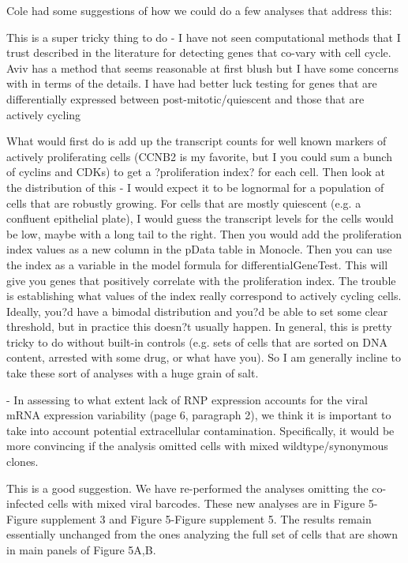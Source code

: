 \documentclass[11pt, oneside]{article}   	%
\begin{document}
{\color{red}
Cole had some suggestions of how we could do a few analyses that address this:

This is a super tricky thing to do - I have not seen computational methods that I trust described in the literature for detecting genes that co-vary with cell cycle. Aviv has a method that seems reasonable at first blush but I have some concerns with in terms of the details.
I have had better luck testing for genes that are differentially expressed between post-mitotic/quiescent and those that are actively cycling

What would first do is add up the transcript counts for well known markers of actively proliferating cells (CCNB2 is my favorite, but I you could sum a bunch of cyclins and CDKs) to get a ?proliferation index? for each cell. Then look at the distribution of this - I would expect it to be lognormal for a population of cells that are robustly growing. For cells that are mostly quiescent (e.g. a confluent epithelial plate), I would guess the transcript levels for the cells would be low, maybe with a long tail to the right. Then you would add the proliferation index values as a new column in the pData table in Monocle. Then you can use the index as a variable in the model formula for differentialGeneTest. This will give you genes that positively correlate with the proliferation index.
The trouble is establishing what values of the index really correspond to actively cycling cells. Ideally, you?d have a bimodal distribution and you?d be able to set some clear threshold, but in practice this doesn?t usually happen. In general, this is pretty tricky to do without built-in controls (e.g. sets of cells that are sorted on DNA content, arrested with some drug, or what have you).
So I am generally incline to take these sort of analyses with a huge grain of salt.
}

- In assessing to what extent lack of RNP expression accounts for the viral mRNA expression variability (page 6, paragraph 2), we think it is important to take into account potential extracellular contamination. Specifically, it would be more convincing if the analysis omitted cells with mixed wildtype/synonymous clones. 

{\color{black}
This is a good suggestion.
We have re-performed the analyses omitting the co-infected cells with mixed viral barcodes.
These new analyses are in Figure 5-Figure supplement 3 and Figure 5-Figure supplement 5.
The results remain essentially unchanged from the ones analyzing the full set of cells that are shown in main panels of Figure 5A,B.
}
\end{document}

